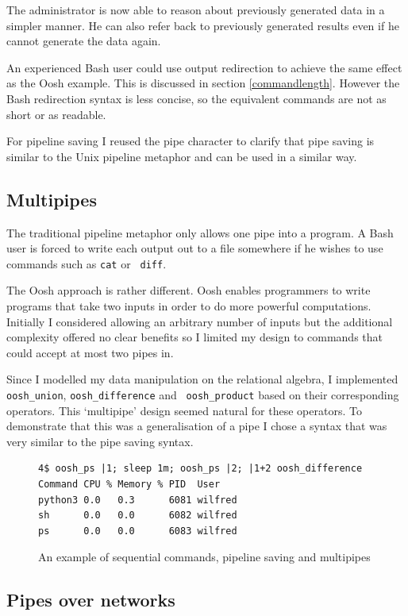 \documentclass[12pt,twoside,notitlepage]{report}
\begin{document}
The administrator is now able to reason about previously generated data in a
simpler manner. He can also refer back to previously generated results
even if he cannot generate the data again.

An experienced Bash user could use output redirection to achieve the
same effect as the Oosh example. This is discussed in section
\ref{commandlength}. However the Bash redirection syntax is less
concise, so the equivalent commands are not as short or as readable.

For pipeline saving I reused the pipe character to clarify that pipe
saving is similar to the Unix pipeline metaphor and can be used in a
similar way.

\subsection{Multipipes}

The traditional pipeline metaphor only allows one pipe into a
program. A Bash user is forced to write each output out to a file
somewhere if he wishes to use commands such as {\tt cat} or {\tt
  diff}.

The Oosh approach is rather different. Oosh enables programmers to
write programs that take two inputs in order to do more powerful
computations. Initially I considered allowing an arbitrary number of
inputs but the additional complexity offered no clear benefits so I
limited my design to commands that could accept at most two pipes in.

Since I modelled my data manipulation on the relational algebra, I
implemented {\tt oosh\_union}, {\tt oosh\_difference} and {\tt
  oosh\_product} based on their corresponding operators. This
`multipipe' design seemed natural for these operators. To demonstrate
that this was a generalisation of a pipe I chose a syntax that was
very similar to the pipe saving syntax.

\begin{figure}
\begin{verbatim}
4$ oosh_ps |1; sleep 1m; oosh_ps |2; |1+2 oosh_difference
Command CPU % Memory % PID  User
python3 0.0   0.3      6081 wilfred
sh      0.0   0.0      6082 wilfred
ps      0.0   0.0      6083 wilfred
\end{verbatim}
\caption{An example of sequential commands, pipeline saving and multipipes}
\end{figure}

\subsection{Pipes over networks}
\end{document}
